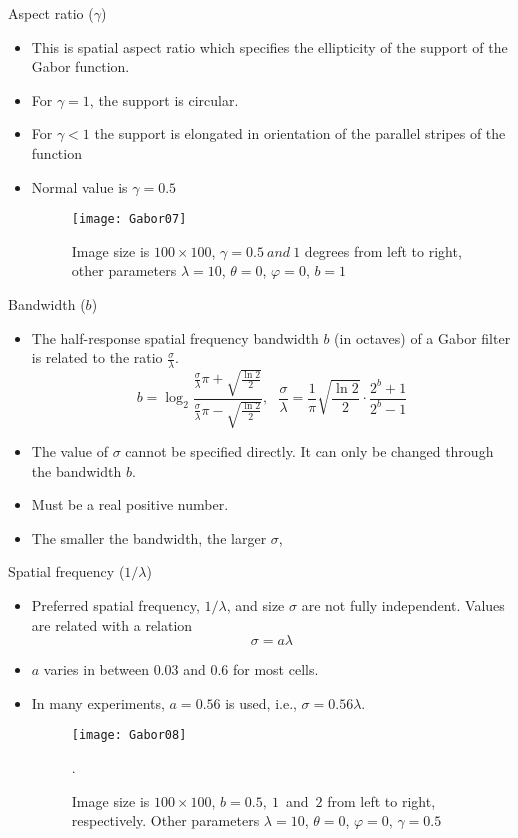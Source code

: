 \begin{frame}{Aspect ratio ($\gamma$)}
\begin{itemize}
\item This is spatial aspect ratio which specifies the ellipticity of the support of the Gabor function.
\item For $\gamma=1$, the support is circular.
\item For $\gamma <1$ the support is elongated in orientation of the parallel stripes of the function
\item Normal value is $\gamma=0.5$
\begin{figure}
\texttt{[image: Gabor07]}
\caption{Image size is $100\times 100$, $\gamma=0.5~and~1$ degrees from left to right, other parameters $\lambda = 10$, $\theta = 0$, $\varphi=0$, $b = 1$}
\end{figure}
\end{itemize}
\end{frame}

\begin{frame}{Bandwidth ($b$)}
\begin{itemize}
\item The half-response spatial frequency bandwidth $b$ (in octaves)  of a Gabor filter is related to the ratio $\frac{\sigma}{\lambda}$.
\[b = {\log _2}\frac{{\frac{\sigma }{\lambda }\pi  + \sqrt {\frac{{\ln 2}}{2}} }}{{\frac{\sigma }{\lambda }\pi  - \sqrt {\frac{{\ln 2}}{2}} }},~~~\frac{\sigma }{\lambda } = \frac{1}{\pi }\sqrt {\frac{{\ln 2}}{2}}  \cdot \frac{{{2^b} + 1}}{{{2^b} - 1}}\]
\item The value of $\sigma$ cannot be specified directly. It can only be changed through the bandwidth $b$.
\item Must be a real positive number.
\item The smaller the bandwidth, the larger $\sigma$,
\end{itemize}
\end{frame}

\begin{frame}{Spatial frequency (${1}/{\lambda}$)}
\begin{itemize}
\item Preferred spatial frequency, ${1}/{\lambda}$, and size $\sigma$ are not fully independent. Values are related with a relation
\begin{equation}
\sigma = a\lambda \nonumber
\end{equation}
\item $a$ varies in between $0.03$ and $0.6$ for most cells.
\item In many experiments, $a=0.56$ is used, i.e., $\sigma=0.56\lambda$.
\begin{figure}
\texttt{[image: Gabor08]}
\caption{Image size is $100\times 100$, $b=0.5,~1$~and~$2$ from left to right, respectively. Other parameters $\lambda = 10$, $\theta = 0$, $\varphi=0$, $\gamma= 0.5$}.
\end{figure}
\end{itemize}
\end{frame}
